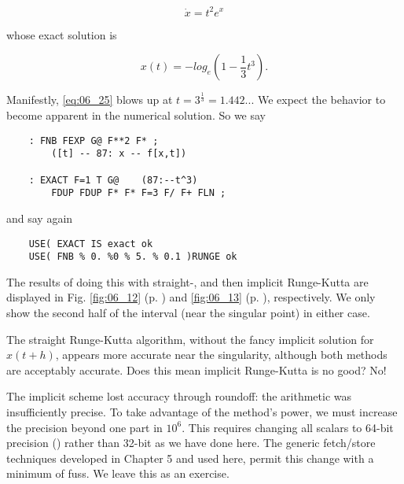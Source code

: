\begin{equation}
\dot{x} = t^2e^x
\end{equation}

whose exact solution is

\begin{equation}
x(t) = -log_e(1-\frac{1}{3}t^3).
\label{eq:06_25}
\end{equation}

Manifestly, \ref{eq:06_25} blows up at $t = 3^\frac{1}{3}=1.442...$ We expect the behavior to become apparent in the numerical solution. So we say

\begin{lstlisting}
    : FNB FEXP G@ F**2 F* ;
        ([t] -- 87: x -- f[x,t])

    : EXACT F=1 T G@    (87:--t^3)
        FDUP FDUP F* F* F=3 F/ F+ FLN ;
\end{lstlisting}

and say again
\begin{lstlisting}
    USE( EXACT IS exact ok
    USE( FNB % 0. %0 % 5. % 0.1 )RUNGE ok
\end{lstlisting}

The results of doing this with straight-, and then implicit Runge-Kutta are displayed in Fig. \ref{fig:06_12} (p. \pageref{fig:06_12}) and \ref{fig:06_13} (p. \pageref{fig:06_13}), respectively. We only show the second half of the interval (near the singular point) in either case.

The straight Runge-Kutta algorithm, without the fancy implicit solution for $x(t +h)$, appears more accurate near the singularity, although both methods are acceptably accurate. Does this mean implicit Runge-Kutta is no good? No!

The implicit scheme lost accuracy through roundoff: the arithmetic was insufficiently precise. To take advantage of the method's power, we must increase the precision beyond one part in $10^{6}$. This requires changing all scalars to 64-bit precision () rather than 32-bit as we have done here. The generic fetch/store techniques developed in Chapter 5 and used here, permit this change with a minimum of fuss. We leave this as an exercise.

